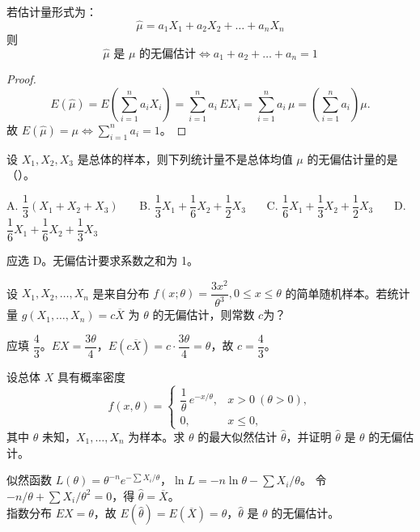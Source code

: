 \documentclass[lang=cn,11pt]{elegantbook}
\begin{document}
\begin{proposition}[系数和为1]\label{prop:unbiased-coeff}
若估计量形式为：
\[
\hat \mu = a_1 X_1 + a_2 X_2 + \dots + a_n X_n
\]
则
\[
\hat\mu \text{ 是 } \mu \text{ 的无偏估计} \iff a_1+a_2+\dots+a_n=1
\]
\end{proposition}
\begin{proof}
\[
E(\hat{\mu}) = E\!\left(\sum_{i=1}^{n}a_i X_i\right) = \sum_{i=1}^{n}a_i\,EX_i = \sum_{i=1}^{n}a_i\,\mu = \left(\sum_{i=1}^{n}a_i\right)\mu.
\]
故 \(E(\hat{\mu})=\mu \iff \displaystyle\sum_{i=1}^{n}a_i = 1\)。
\end{proof}

\begin{exercise}\label{exer:7-unbiased-judge}
设 \(X_1, X_2, X_3\) 是总体的样本，则下列统计量不是总体均值 \(\mu\) 的无偏估计量的是（\quad）。\par
A. \(\dfrac{1}{3}(X_1+X_2+X_3)\)~~~ B. \(\dfrac{1}{3}X_1+\dfrac{1}{6}X_2+\dfrac{1}{2}X_3\)~~~
C. \(\dfrac{1}{6}X_1+\dfrac{1}{3}X_2+\dfrac{1}{2}X_3\)~~~ D. \(\dfrac{1}{6}X_1+\dfrac{1}{6}X_2+\dfrac{1}{3}X_3\)
\end{exercise}
\begin{solution}
应选 D。无偏估计要求系数之和为 1。
\end{solution}

\begin{exercise}\label{exer:7-unbiased-c}
设 \(X_1, X_2, \dots, X_n\) 是来自分布 \(f(x;\theta) = \dfrac{3x^2}{\theta^3},0 \leq x \leq \theta\) 的简单随机样本。若统计量 \(g(X_1, \dots, X_n) = c\overline{X}\) 为 \(\theta\) 的无偏估计，则常数 \(c\)为？
\end{exercise}
\begin{solution}
应填 \(\dfrac{4}{3}\)。\(EX = \dfrac{3\theta}{4}\)，\(E(c\overline{X}) = c\cdot\dfrac{3\theta}{4} = \theta\)，故 \(c = \dfrac{4}{3}\)。
\end{solution}

\begin{exercise}\label{exer:7-exp-mle}
设总体 \(X\) 具有概率密度
\[
f(x,\theta) = \begin{cases} \dfrac{1}{\theta}\,e^{-x/\theta}, & x > 0\ (\theta > 0), \\ 0, & x \leq 0, \end{cases}
\]
其中 \(\theta\) 未知，\(X_1, \dots, X_n\) 为样本。求 \(\theta\) 的最大似然估计 \(\hat{\theta}\)，并证明 \(\hat{\theta}\) 是 \(\theta\) 的无偏估计。
\end{exercise}
\begin{solution}
似然函数 \(L(\theta) = \theta^{-n}e^{-\sum X_i/\theta}\)，\(\ln L = -n\ln\theta - \sum X_i/\theta\)。
令 \(-n/\theta + \sum X_i/\theta^2 = 0\)，得 \(\hat{\theta} = \overline{X}\)。\\
指数分布 \(EX = \theta\)，故 \(E(\hat{\theta}) = E(\overline{X}) = \theta\)，\(\hat{\theta}\) 是 \(\theta\) 的无偏估计。
\end{solution}
\end{document}
